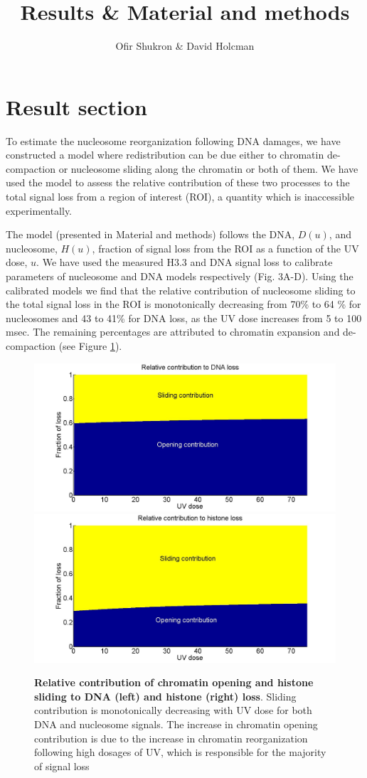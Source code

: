 \documentclass[12pt]{article}
\begin{document}
	
\title{Results \& Material and methods}
\author{Ofir Shukron \& David Holcman}
\maketitle

\section{Result section}

To estimate the nucleosome reorganization following DNA damages, we have constructed a model where redistribution can be due either to chromatin de-compaction or nucleosome sliding along the chromatin or both of them. We have used the model to assess the relative contribution of these two processes to the total signal loss from a region of interest (ROI), a quantity which is inaccessible experimentally. 

The model (presented in Material and methods) follows the DNA, $D(u)$, and nucleosome, $H(u)$, fraction of signal loss from the ROI as a function of the UV dose, $u$. We have used the measured H3.3 and DNA signal loss to calibrate parameters of nucleosome and DNA models respectively (Fig. 3A-D). Using the calibrated models we find that the relative contribution of nucleosome sliding to the total signal loss in the ROI is monotonically decreasing from 70\% to 64 \% for nucleosomes and 43 to 41\% for DNA loss, as the UV dose increases from 5 to 100 msec. The remaining percentages are attributed to chromatin expansion and de-compaction (see Figure \ref{fig:relatiiveContributionToLoss}).

\begin{figure}[H]
	\includegraphics[width=0.5\linewidth, height=0.3\textheight]{relatiiveContributionToDNALoss}
	\includegraphics[width=0.5\linewidth, height=0.3\textheight]{relativeContributionToHistoneLoss}
	\caption{\textbf{Relative contribution of chromatin opening and histone sliding to DNA (left) and histone (right) loss}. Sliding contribution is monotonically decreasing with UV dose for both DNA and nucleosome signals. The increase in chromatin opening contribution is due to the increase in chromatin reorganization following high dosages of UV, which is responsible for the majority of signal loss}
	\label{fig:relatiiveContributionToLoss}
\end{figure}
\end{document}
